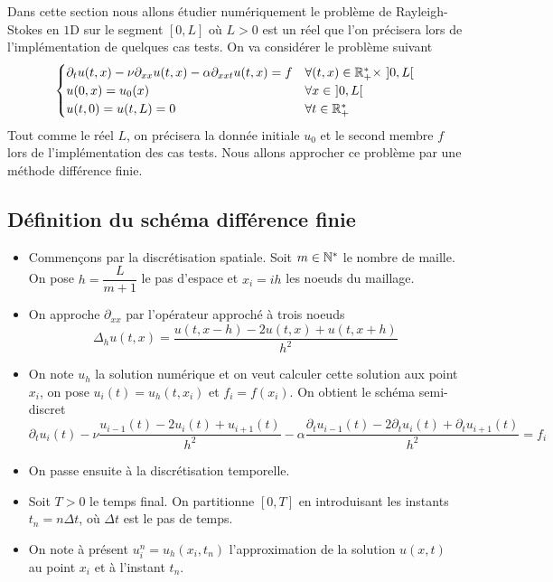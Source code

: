 \begin{frame}
    Dans cette section nous allons étudier numériquement le problème de Rayleigh-Stokes en $1$D sur le segment $[0, L]$ où $L>0$ est un réel que l'on précisera lors de l'implémentation de quelques cas tests. On va considérer le problème suivant
\begin{equation*}
\begin{cases}
    \partial_tu(t,x) - \nu\partial_{xx} u(t,x) - \alpha\partial_{xxt} u(t,x) = f & \forall (t,x) \in  \mathbb{R}_+^* \times \ ]0,L[  \\
    u(0,x) = u_0(x) & \forall x \in \ ]0,L[ \\
    u(t, 0) = u(t,L) = 0 & \forall t \in \mathbb{R}_+^*
\end{cases}
\end{equation*}
Tout comme le réel $L$, on précisera la donnée initiale $u_0$ et le second membre $f$ lors de l'implémentation des cas tests. Nous allons approcher ce problème par une méthode différence finie.
\end{frame}

\subsection{Définition du schéma différence finie}
\begin{frame}
    \begin{itemize}
        \item Commençons par la discrétisation spatiale. Soit $m \in \mathbb{N}^*$ le nombre de maille. On pose $h = \dfrac{L}{m+1}$ le pas d'espace et $x_i = ih$ les noeuds du maillage. 
        \item On approche $\partial_{xx}$ par l'opérateur approché à trois noeuds
\begin{equation*}
    \Delta_hu(t,x) = \frac{u(t,x-h)-2u(t,x)+u(t,x+h)}{h^2}
\end{equation*}
\item On note $u_h$ la solution numérique et on veut calculer cette solution aux point $x_i$, on pose $u_i(t)=u_h(t,x_i)$ et $f_i=f(x_i)$. On obtient le schéma semi-discret
\begin{equation*}\label{schema_semi_discret}
    \partial_tu_i(t)-\nu\frac{u_{i-1}(t)-2u_i(t)+u_{i+1}(t)}{h^2}-\alpha\frac{\partial_tu_{i-1}(t)-2\partial_tu_i(t)+\partial_tu_{i+1}(t)}{h^2}=f_i
\end{equation*}
\item On passe ensuite à la discrétisation temporelle. 
        \item Soit $T>0$ le temps final. On partitionne $[0,T]$ en introduisant les instants 
$t_n = n \Delta t$, où $\Delta t$ est le pas de temps. 
\item On note à présent $u_i^n=u_h(x_i,t_n)$ l'approximation de la 
solution $u(x,t)$ au point $x_i$ et à l'instant $t_n$. 
    \end{itemize}
\end{frame}

